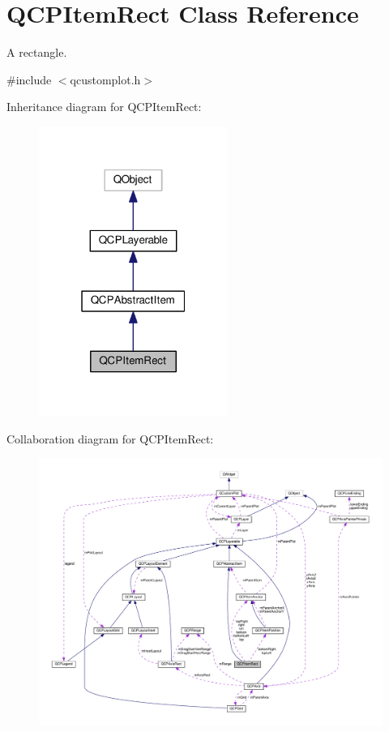 \hypertarget{classQCPItemRect}{}\section{Q\+C\+P\+Item\+Rect Class Reference}
\label{classQCPItemRect}


A rectangle.  




{\ttfamily \#include $<$qcustomplot.\+h$>$}



Inheritance diagram for Q\+C\+P\+Item\+Rect\+:
\nopagebreak
\begin{figure}[H]
\begin{center}
\leavevmode
\includegraphics[width=175pt]{classQCPItemRect__inherit__graph}
\end{center}
\end{figure}


Collaboration diagram for Q\+C\+P\+Item\+Rect\+:
\nopagebreak
\begin{figure}[H]
\begin{center}
\leavevmode
\includegraphics[width=350pt]{classQCPItemRect__coll__graph}
\end{center}
\end{figure}
